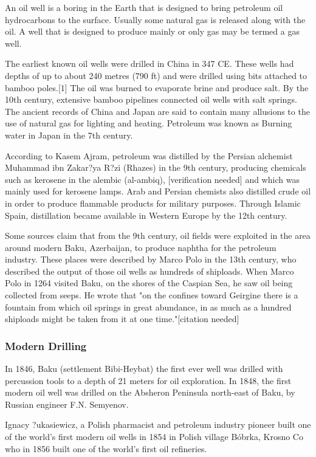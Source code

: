 An oil well is a boring in the Earth that is designed to bring petroleum oil hydrocarbons to the surface. Usually some natural gas is released along with the oil. A well that is designed to produce mainly or only gas may be termed a gas well.

The earliest known oil wells were drilled in China in 347 CE. These wells had depths of up to about 240 metres (790 ft) and were drilled using bits attached to bamboo poles.[1] The oil was burned to evaporate brine and produce salt. By the 10th century, extensive bamboo pipelines connected oil wells with salt springs. The ancient records of China and Japan are said to contain many allusions to the use of natural gas for lighting and heating. Petroleum was known as Burning water in Japan in the 7th century.

According to Kasem Ajram, petroleum was distilled by the Persian alchemist Muhammad ibn Zakar?ya R?zi (Rhazes) in the 9th century, producing chemicals such as kerosene in the alembic (al-ambiq), [verification needed] and which was mainly used for kerosene lamps. Arab and Persian chemists also distilled crude oil in order to produce flammable products for military purposes. Through Islamic Spain, distillation became available in Western Europe by the 12th century.

Some sources claim that from the 9th century, oil fields were exploited in the area around modern Baku, Azerbaijan, to produce naphtha for the petroleum industry. These places were described by Marco Polo in the 13th century, who described the output of those oil wells as hundreds of shiploads. When Marco Polo in 1264 visited Baku, on the shores of the Caspian Sea, he saw oil being collected from seeps. He wrote that "on the confines toward Geirgine there is a fountain from which oil springs in great abundance, in as much as a hundred shiploads might be taken from it at one time."[citation needed]

\subsubsection{Modern Drilling}

In 1846, Baku (settlement Bibi-Heybat) the first ever well was drilled with percussion tools to a depth of 21 meters for oil exploration. In 1848, the first modern oil well was drilled on the Absheron Peninsula north-east of Baku, by Russian engineer F.N. Semyenov.

Ignacy ?ukasiewicz, a Polish pharmacist and petroleum industry pioneer built one of the world's first modern oil wells in 1854 in Polish village B\'obrka, Krosno Co who in 1856 built one of the world's first oil refineries.

